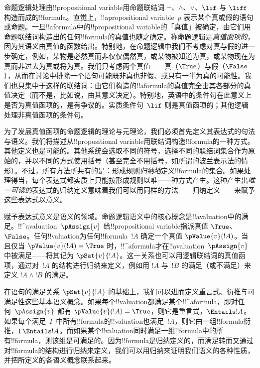 \documentclass[../../../include/open-logic-section]{subfiles}
\begin{document}


命题逻辑处理由!!{propositional variable}用命题联结词 $\lnot$、$\land$、$\lor$、$\lif$ 与 $\liff$ 构造而成的!!{formula}。直觉上，!!a{propositional variable}~$p$ 表示某个真或假的语句或命题。一旦!!a{formula}中的!!{propositional variable}的「真值」被确定，由它们用命题联结词构造出的任何!!{formula}的真值也随之确定。称命题逻辑是\emph{真值函项的}，因为其语义由真值的函数给出。特别地，在命题逻辑中我们不考虑对真与假的进一步确定，例如，某物是必然真而非仅仅偶然真，或某物被知道为真，或某物现在为真而非过去为真或将为真。我们只考虑两个真值——真（$\True$）与假（$\False$），从而在讨论中排除一个语句可能既非真也非假、或只有一半为真的可能性。我们也只集中于这样的联结词：由它们构造的!!a{formula}的真值完全由其各部分的真值决定（而不是，比如说，由其意义决定）。特别地，英语中的条件句在此意义上是否为真值函项的，是有争议的。实质条件句~$\lif$ 则是真值函项的；其他逻辑处理非真值函项的条件句。

为了发展真值函项的命题逻辑的理论与元理论，我们必须首先定义其表达式的句法与语义。我们将描述从!!{propositional variable}用联结词构造!!{formula}的一种方式。其他定义也是可能的。其他系统会选取不同的符号，选择不同的联结词集合作为原始的，并以不同的方式使用括号（甚至完全不用括号，如所谓的波兰表示法的情形）。不过，所有方法所共有的是：形成规则\emph{归纳地}定义!!{formula}的集合。如果处理得当，每个表达式都实质上只能按形成规则以唯一一种方式产生。这种产生出\emph{唯一可读的}表达式的归纳定义意味着我们可以用同样的方法——归纳定义——来赋予这些表达式以意义。

赋予表达式意义是语义的领域。命题逻辑语义中的核心概念是!!a{valuation}中的满足。!!^a{valuation}~$\pAssign{v}$ 给!!{propositional variable}指派真值 $\True$、$\False$。任何!!{valuation}为任何!!{formula}~$!A$ 确定一个真值 $\pValue{v}(!A)$。当且仅当 $\pValue{v}(!A) = \True$ 时，!!^a{formula}才在!!a{valuation}~$\pAssign{v}$ 中被满足——将其记为 $\pSat{v}{!A}$。这一关系也可以用逻辑联结词的真值函项，通过对~$!A$ 的结构进行归纳来定义，例如用 $!A$ 与~$!B$ 的满足（或不满足）来定义 $!A \land !B$ 的满足。

在语句的满足关系 $\pSat{v}{!A}$ 的基础上，我们可以进而定义重言式、衍推与可满足性这些基本语义概念。如果每个!!{valuation}都满足某个!!^a{formula}，即对任何~$\pAssign{v}$ 都有 $\pValue{v}(!A) = \True$，则它是重言式，$\Entails !A$。如果每个满足~$\Gamma$ 中所有!!{formula}的!!{valuation}也满足~$!A$，则它由一组!!{formula}衍推，$\Gamma \Entails !A$。而如果某个!!{valuation}同时满足一组!!{formula}中的所有!!{formula}，则该组是可满足的。因为!!{formula}是归纳定义的，而满足转而又通过对!!{formula}的结构进行归纳来定义，我们可以用归纳来证明我们语义的各种性质，并把所定义的各语义概念联系起来。
\end{document}
